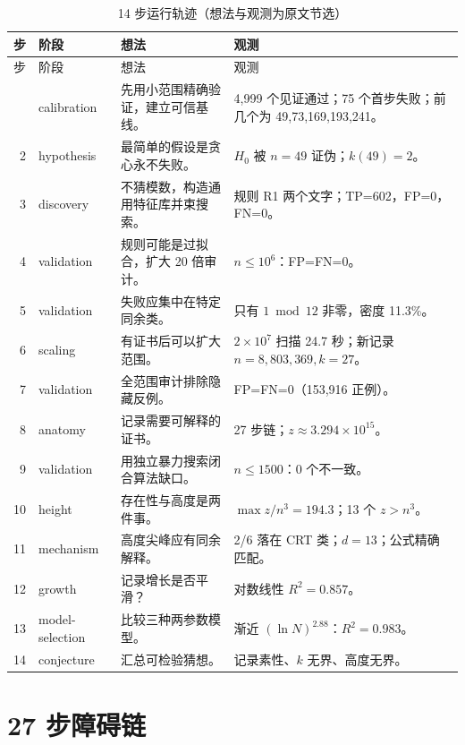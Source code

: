 \documentclass[11pt,a4paper]{ctexart}
\theoremstyle{definition}
\theoremstyle{remark}
\begin{document}
\begin{longtable}{@{}r p{2.1cm} p{5.4cm} p{6.2cm}@{}}
\caption{14 步运行轨迹（想法与观测为原文节选）}\label{tab:fulltrace}\\
\toprule
步 & 阶段 & 想法 & 观测 \\
\midrule
\endfirsthead
\toprule
步 & 阶段 & 想法 & 观测 \\
\midrule
\endhead
\bottomrule
\endfoot
1 & calibration & 先用小范围精确验证，建立可信基线。 & 4{,}999 个见证通过；75 个首步失败；前几个为 49,73,169,193,241。\\
2 & hypothesis & 最简单的假设是贪心永不失败。 & $H_0$ 被 $n=49$ 证伪；$k(49)=2$。\\
3 & discovery & 不猜模数，构造通用特征库并束搜索。 & 规则 R1 两个文字；TP=602，FP=0，FN=0。\\
4 & validation & 规则可能是过拟合，扩大 20 倍审计。 & $n\le10^6$：FP=FN=0。\\
5 & validation & 失败应集中在特定同余类。 & 只有 $1\bmod12$ 非零，密度 11.3\%。\\
6 & scaling & 有证书后可以扩大范围。 & $2\times10^7$ 扫描 24.7 秒；新记录 $n=8{,}803{,}369,k=27$。\\
7 & validation & 全范围审计排除隐藏反例。 & FP=FN=0（153{,}916 正例）。\\
8 & anatomy & 记录需要可解释的证书。 & 27 步链；$z\approx3.294\times10^{15}$。\\
9 & validation & 用独立暴力搜索闭合算法缺口。 & $n\le1500$：0 个不一致。\\
10 & height & 存在性与高度是两件事。 & $\max z/n^3=194.3$；13 个 $z>n^3$。\\
11 & mechanism & 高度尖峰应有同余解释。 & 2/6 落在 CRT 类；$d=13$；公式精确匹配。\\
12 & growth & 记录增长是否平滑？ & 对数线性 $R^2=0.857$。\\
13 & model-selection & 比较三种两参数模型。 & 渐近 $(\ln N)^{2.88}$：$R^2=0.983$。\\
14 & conjecture & 汇总可检验猜想。 & 记录素性、$k$ 无界、高度无界。\\
\end{longtable}

\section{27 步障碍链}
\end{document}
